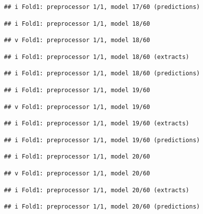 \documentclass[
]{article}
\begin{document}
\begin{verbatim}
## i Fold1: preprocessor 1/1, model 17/60 (predictions)
\end{verbatim}

\begin{verbatim}
## i Fold1: preprocessor 1/1, model 18/60
\end{verbatim}

\begin{verbatim}
## v Fold1: preprocessor 1/1, model 18/60
\end{verbatim}

\begin{verbatim}
## i Fold1: preprocessor 1/1, model 18/60 (extracts)
\end{verbatim}

\begin{verbatim}
## i Fold1: preprocessor 1/1, model 18/60 (predictions)
\end{verbatim}

\begin{verbatim}
## i Fold1: preprocessor 1/1, model 19/60
\end{verbatim}

\begin{verbatim}
## v Fold1: preprocessor 1/1, model 19/60
\end{verbatim}

\begin{verbatim}
## i Fold1: preprocessor 1/1, model 19/60 (extracts)
\end{verbatim}

\begin{verbatim}
## i Fold1: preprocessor 1/1, model 19/60 (predictions)
\end{verbatim}

\begin{verbatim}
## i Fold1: preprocessor 1/1, model 20/60
\end{verbatim}

\begin{verbatim}
## v Fold1: preprocessor 1/1, model 20/60
\end{verbatim}

\begin{verbatim}
## i Fold1: preprocessor 1/1, model 20/60 (extracts)
\end{verbatim}

\begin{verbatim}
## i Fold1: preprocessor 1/1, model 20/60 (predictions)
\end{verbatim}
\end{document}
